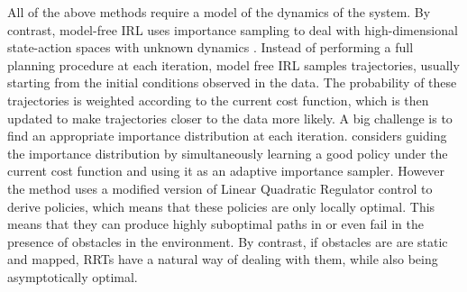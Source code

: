 \documentclass[letterpaper, 10 pt, conference]{ieeeconf}
\newcommand{\ks}[1]{\textcolor{green}{KS: #1}}
\begin{document}
All of the above methods require a model of the dynamics of the system. By contrast, model-free IRL uses importance sampling to deal with high-dimensional state-action spaces with unknown dynamics \cite{boularias2011relative,kalakrishnan2013learning}. Instead of performing a full planning procedure at each iteration, model free IRL samples trajectories, usually starting from the initial conditions observed in the data. The probability of these trajectories is weighted according to the current cost function, which is then updated to make trajectories closer to the data more likely. A big challenge is to find an appropriate importance distribution at each iteration. \cite{finn2016guided} considers guiding the importance distribution by simultaneously learning a good policy under the current cost function and using it as an adaptive importance sampler. However the method uses a modified version of Linear Quadratic Regulator control to derive policies, which means that these policies are only locally optimal. This means that they can produce highly suboptimal paths in or even fail in the presence of obstacles in the environment. By contrast, if obstacles are are static and mapped, RRTs have a natural way of dealing with them, while also being asymptotically optimal.








\end{document}
